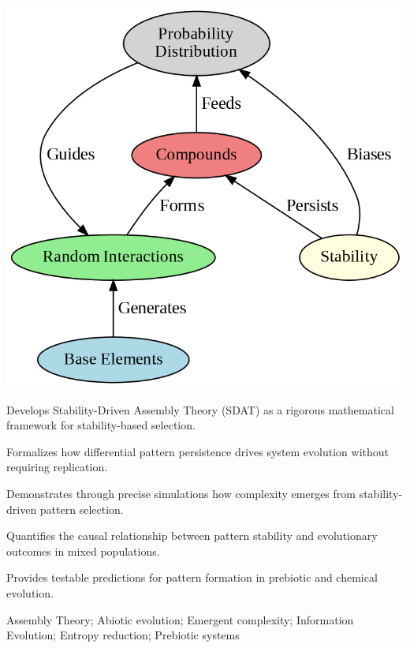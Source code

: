 \documentclass[preprint,12pt]{elsarticle}
\begin{document}
\begin{frontmatter}
\begin{graphicalabstract}
\includegraphics[width=1\textwidth]{figure_10}
\end{graphicalabstract}

\begin{highlights}
\item Develops Stability-Driven Assembly Theory (SDAT) as a rigorous mathematical framework for stability-based selection.
\item Formalizes how differential pattern persistence drives system evolution without requiring replication.
\item Demonstrates through precise simulations how complexity emerges from stability-driven pattern selection.
\item Quantifies the causal relationship between pattern stability and evolutionary outcomes in mixed populations.
\item Provides testable predictions for pattern formation in prebiotic and chemical evolution.
\end{highlights}

\begin{keyword}
Assembly Theory; Abiotic evolution; Emergent complexity; Information Evolution; Entropy reduction; Prebiotic systems



\end{keyword}

\end{frontmatter}
\end{document}
